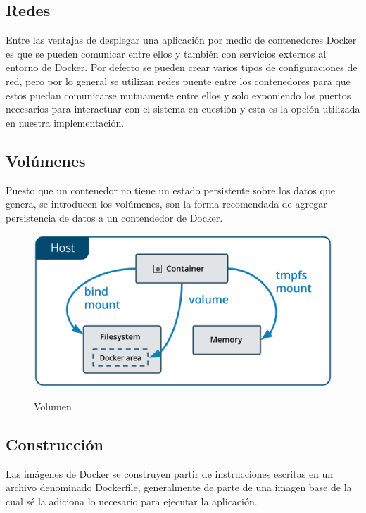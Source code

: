 \subsection{Redes}

Entre las ventajas de desplegar una aplicación por medio de contenedores Docker es que se pueden
comunicar entre ellos y también con servicios externos al entorno de Docker. Por defecto se pueden
crear varios tipos de configuraciones de red, pero por lo general se utilizan redes puente entre
los contenedores para que estos puedan comunicarse mutuamente entre ellos y solo exponiendo los
puertos necesarios para interactuar con el sistema en cuestión y esta es la opción utilizada en
nuestra implementación. \cite{Docker}

\subsection{Volúmenes}
Puesto que un contenedor no tiene un estado persistente sobre los datos que genera, se introducen
los volúmenes, son la forma recomendada de agregar persistencia de datos a un contendedor de
Docker.
\cite{Docker}

\begin{figure}[ht]
	\centering
	\includegraphics[width=\textwidth]{imagenes/cap4/docker-volume.png}
	\caption{Volumen}
  \cite{Docker}
	\label{fig:volume_diagram}
\end{figure}

\subsection{Construcción}
Las imágenes de Docker se construyen partir de instrucciones escritas en un archivo denominado
Dockerfile,
generalmente de parte de una imagen base de la cual sé la adiciona lo necesario para ejecutar la
aplicación.
\cite{Docker}

